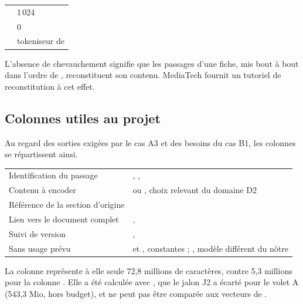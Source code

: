\begin{tabletype}
\begin{tabularx}{\textwidth}{@{}L{4cm}Y@{}}
\toprule
{} &  \\
\midrule
{} & 1\,024 \\
 & 0 \\
 & tokeniseur de  \\
\bottomrule
\end{tabularx}
\end{tabletype}

L'absence de chevauchement signifie que les passages d'une fiche, mis bout à bout dans l'ordre de
, reconstituent son contenu. MediaTech fournit un tutoriel de reconstitution à cet
effet.

\subsection{Colonnes utiles au projet}

Au regard des sorties exigées par le cas A3 et des besoins du cas B1, les colonnes se répartissent
ainsi.

\begin{tabletype}
\begin{tabularx}{\textwidth}{@{}L{5.2cm}Y@{}}
\toprule
{} &  \\
\midrule
Identification du passage & , ,  \\
Contenu à encoder &  ou , choix relevant du domaine D2 \\
Référence de la section d'origine &  \\
Lien vers le document complet & ,  \\
Suivi de version & ,  \\
Sans usage prévu &  et , constantes ; , modèle différent du nôtre \\
\bottomrule
\end{tabularx}
\end{tabletype}

La colonne  représente à elle seule 72,8 millions de caractères, contre
5,3 millions pour la colonne . Elle a été calculée avec , que le jalon J2 a écarté
pour le volet A (543,3 Mio, hors budget), et ne peut pas être comparée aux vecteurs de
.

